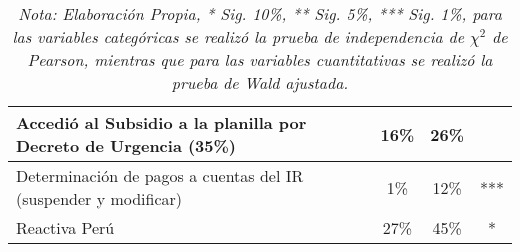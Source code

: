 \documentclass[12pt]{article}
\begin{document}
\begin{table}[H]
\begin{tabular}{m{7.5cm}ccc}
                    \hline
                    Accedió al Subsidio a la planilla por Decreto de Urgencia (35\%) & 16\% & 26\%  &  \\
                    \hline
                    Determinación de pagos a cuentas del IR (suspender y modificar) & 1\% & 12\% & *** \\
                    \hline
                    Reactiva Perú & 27\% & 45\%  & * \\
                    \bottomrule
                \end{tabular}
                \caption*{\it Nota: Elaboración Propia, * Sig. 10\%, ** Sig. 5\%, *** Sig. 1\%, para las variables categóricas se realizó la prueba de independencia de $\chi^{2}$ de Pearson, mientras que para las variables cuantitativas se realizó la prueba de Wald ajustada. }
                \label{tab: Tabla1}
            \end{table}
\end{document}
